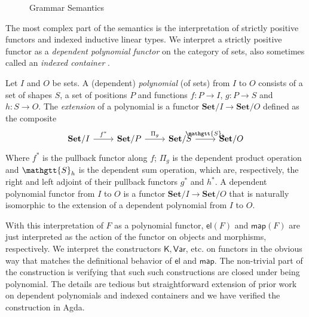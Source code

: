 \documentclass[acmsmall,nonacm]{acmart}
\renewcommand{\Sigma}{\mathgtt{S}}
\newcommand{\Var}{\mathsf{Var}}
\newcommand{\map}{\mathsf{map}}
\newcommand{\Set}{\mathbf{Set}}
\newcommand{\el}{\mathsf{el}}
\begin{document}
{\begin{figure}
\begin{minipage}[t]{.7\textwidth}
\begin{footnotesize}
  \end{footnotesize}
  \end{minipage}
  \caption{Grammar Semantics}
  \label{fig:semantics}
\end{figure}
The most complex part of the semantics is the interpretation of
strictly positive functors and indexed inductive linear types.  We
interpret a strictly positive functor as a \emph{dependent polynomial
functor} on the category of sets, also sometimes called an
\emph{indexed container} \cite{gambino_wellfounded_2004,altenkirch_indexed_2015}.
\begin{definition}
  Let $I$ and $O$ be sets. A (dependent) \emph{polynomial} (of sets)
  from $I$ to $O$ consists of a set of shapes $S$, a set of positions
  $P$ and functions $f : P \to I$, $g : P \to S$ and $h : S \to O$. The \emph{extension}
  of a polynomial is a functor $\Set/I \to \Set/O$ defined as the
  composite
  \[\begin{tikzcd}
	    {\Set/I} & {\Set/P} & {\Set/S} & {\Set/O}
	    \arrow["{f^*}", from=1-1, to=1-2]
	    \arrow["{\Pi_g}", from=1-2, to=1-3]
	    \arrow["{\Sigma_h}", from=1-3, to=1-4]
  \end{tikzcd}\]
  Where $f^*$ is the pullback functor along $f$; $\Pi_g$ is the dependent
  product operation and $\Sigma_h$ is the dependent sum operation, which
  are, respectively, the right and left adjoint of their pullback functors
  $g^*$ and $h^*$. A dependent polynomial functor from $I$ to $O$ is a functor $\Set/I
  \to \Set/O$ that is naturally isomorphic to the extension of a
  dependent polynomial from $I$ to $O$.
\end{definition}
With this interpretation of $F$ as a polynomial functor, $\el(F)$ and
$\map(F)$ are just interpreted as the action of the functor on objects
and morphisms, respectively. We interpret the constructors
$\mathsf{K},\Var$, etc. on functors in the obvious way that matches
the definitional behavior of $\el$ and $\map$. The non-trivial part of
the construction is verifying that such such constructions are closed
under being polynomial. The details are tedious but straightforward
extension of prior work on dependent polynomials and indexed
containers and we have verified the construction in Agda.

}
\end{document}
